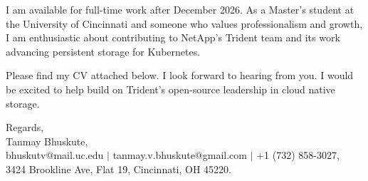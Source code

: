 \documentclass[11pt]{letter}
\begin{document}
\begin{letter}{}
I am available for full-time work after December 2026. As a Master's student at the University of Cincinnati and someone who values professionalism and growth, I am enthusiastic about contributing to NetApp's Trident team and its work advancing persistent storage for Kubernetes.

Please find my CV attached below. I look forward to hearing from you. I would be excited to help build on Trident's open-source leadership in cloud native storage.

{\setlength{\parskip}{0pt}
Regards,\\
Tanmay Bhuskute,\\
bhuskutv@mail.uc.edu $\mid$ tanmay.v.bhuskute@gmail.com $\mid$ +1 (732) 858-3027,\\
3424 Brookline Ave, Flat 19, Cincinnati, OH 45220.
}

\end{letter}
\end{document}
